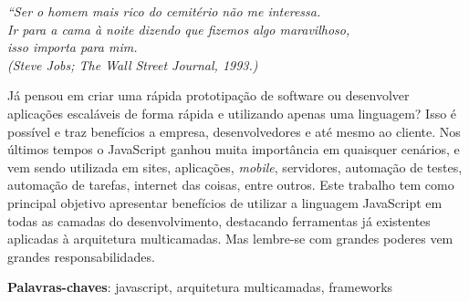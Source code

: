 \documentclass[
	12pt,				%
	openright,			%
	twoside,			%
	a4paper,			%
	english,			%
	brazil				%
	]{abntex2}
\begin{document}

\begin{epigrafe}
    \vspace*{\fill}
	\begin{flushright}
		\textit{``Ser o homem mais rico do cemitério não me interessa.\\
		Ir para a cama à noite dizendo que fizemos algo maravilhoso, \\ isso importa para mim. \\
		(Steve Jobs; The Wall Street Journal, 1993.)}
	\end{flushright}
\end{epigrafe}


\setlength{\absparsep}{18pt} %
\begin{resumo}
Já pensou em criar uma rápida prototipação de software ou desenvolver aplicações escaláveis de forma rápida e utilizando apenas uma linguagem? Isso é possível e traz benefícios a empresa, desenvolvedores e até mesmo ao cliente. Nos últimos tempos o JavaScript ganhou muita importância em quaisquer cenários, e vem sendo utilizada em sites, aplicações, \textit{mobile}, servidores, automação de testes, automação de tarefas, internet das coisas, entre outros. Este trabalho tem como principal objetivo apresentar benefícios de utilizar a linguagem JavaScript em todas as camadas do desenvolvimento, destacando ferramentas já existentes aplicadas à arquitetura multicamadas. Mas lembre-se com grandes poderes vem grandes responsabilidades.

 \vspace{\onelineskip}

 \textbf{Palavras-chaves}: javascript, arquitetura multicamadas, frameworks
\end{resumo}
\end{document}
